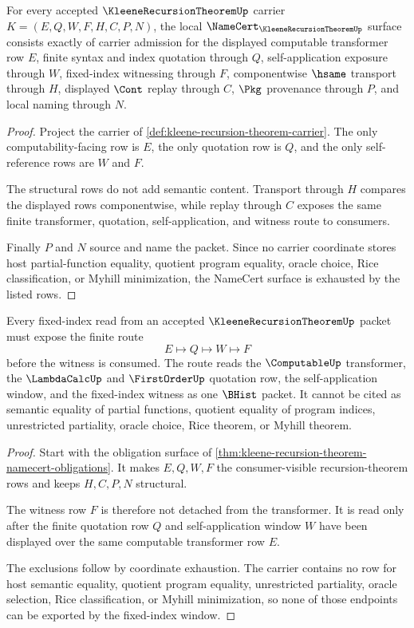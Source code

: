 \begin{theorem}
\label{thm:kleene-recursion-theorem-namecert-obligations}
For every accepted $\KleeneRecursionTheoremUp$ carrier $K=(E,Q,W,F,H,C,P,N)$, the local $\NameCert_{\KleeneRecursionTheoremUp}$ surface consists exactly of carrier admission for the displayed computable transformer row $E$, finite syntax and index quotation through $Q$, self-application exposure through $W$, fixed-index witnessing through $F$, componentwise $\hsame$ transport through $H$, displayed $\Cont$ replay through $C$, $\Pkg$ provenance through $P$, and local naming through $N$.
\end{theorem}
\begin{proof}
Project the carrier of \autoref{def:kleene-recursion-theorem-carrier}. The only computability-facing row is $E$, the only quotation row is $Q$, and the only self-reference rows are $W$ and $F$.

The structural rows do not add semantic content. Transport through $H$ compares the displayed rows componentwise, while replay through $C$ exposes the same finite transformer, quotation, self-application, and witness route to consumers.

Finally $P$ and $N$ source and name the packet. Since no carrier coordinate stores host partial-function equality, quotient program equality, oracle choice, Rice classification, or Myhill minimization, the NameCert surface is exhausted by the listed rows.
\end{proof}

\begin{theorem}
\label{thm:kleene-recursion-theorem-fixed-index-window}
Every fixed-index read from an accepted $\KleeneRecursionTheoremUp$ packet must expose the finite route
$$
E \longmapsto Q \longmapsto W \longmapsto F
$$
before the witness is consumed. The route reads the $\ComputableUp$ transformer, the $\LambdaCalcUp$ and $\FirstOrderUp$ quotation row, the self-application window, and the fixed-index witness as one $\BHist$ packet. It cannot be cited as semantic equality of partial functions, quotient equality of program indices, unrestricted partiality, oracle choice, Rice theorem, or Myhill theorem.
\end{theorem}
\begin{proof}
Start with the obligation surface of \autoref{thm:kleene-recursion-theorem-namecert-obligations}. It makes $E,Q,W,F$ the consumer-visible recursion-theorem rows and keeps $H,C,P,N$ structural.

The witness row $F$ is therefore not detached from the transformer. It is read only after the finite quotation row $Q$ and self-application window $W$ have been displayed over the same computable transformer row $E$.

The exclusions follow by coordinate exhaustion. The carrier contains no row for host semantic equality, quotient program equality, unrestricted partiality, oracle selection, Rice classification, or Myhill minimization, so none of those endpoints can be exported by the fixed-index window.
\end{proof}

